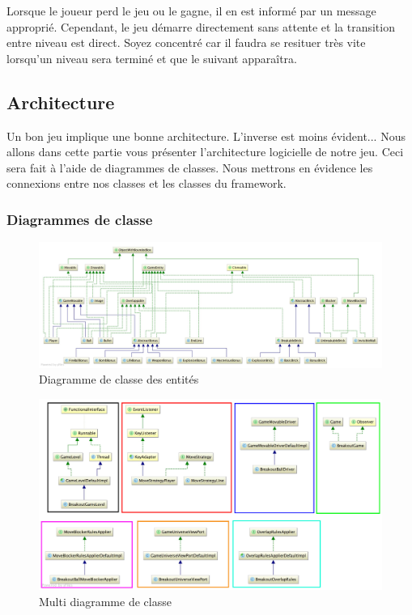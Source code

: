 \documentclass[a4paper,10pt]{article}
\begin{document}
        Lorsque le joueur perd le jeu ou le gagne, il en est informé par un message approprié. Cependant, le jeu démarre
        directement sans attente et la transition entre niveau est direct. Soyez concentré car il faudra
        se resituer très vite lorsqu'un niveau sera terminé et que le suivant apparaîtra.


\subsection{Architecture}
    Un bon jeu implique une bonne architecture. L'inverse est moins évident...
	Nous allons dans cette partie vous présenter l'architecture logicielle de notre jeu. Ceci sera fait à l'aide de
	diagrammes de classes.
	Nous mettrons en évidence les connexions entre nos classes et les classes du framework.

	\newpage
	\subsubsection{Diagrammes de classe}

		\FloatBarrier
		\begin{figure}[!h]
    		\begin{center}
	  	  	\includegraphics[scale=0.170]{images/whiteEntityDiagram.jpg}
          	\caption{Diagramme de classe des entités}
    		\end{center}
		\end{figure}
		\FloatBarrier


 		\FloatBarrier
 		\begin{figure}[!h]
     		\begin{center}
 	  	  	\includegraphics[scale=0.2]{images/whiteSeveralDiagram.jpg}
           	\caption{Multi diagramme de classe}
     		\end{center}
 		\end{figure}
 		\FloatBarrier
\end{document}
